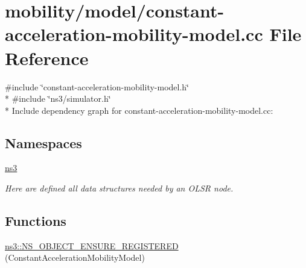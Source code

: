 \hypertarget{constant-acceleration-mobility-model_8cc}{}\section{mobility/model/constant-\/acceleration-\/mobility-\/model.cc File Reference}
\label{constant-acceleration-mobility-model_8cc}
{\ttfamily \#include \char`\"{}constant-\/acceleration-\/mobility-\/model.\+h\char`\"{}}\\*
{\ttfamily \#include \char`\"{}ns3/simulator.\+h\char`\"{}}\\*
Include dependency graph for constant-\/acceleration-\/mobility-\/model.cc\+:
\subsection*{Namespaces}
\begin{DoxyCompactItemize}
\item 
 \hyperlink{namespacens3}{ns3}
\begin{DoxyCompactList}\small\item\em Here are defined all data structures needed by an O\+L\+SR node. \end{DoxyCompactList}\end{DoxyCompactItemize}
\subsection*{Functions}
\begin{DoxyCompactItemize}
\item 
\hyperlink{namespacens3_a32e9cba882bb4b5ae4334333f2821d44}{ns3\+::\+N\+S\+\_\+\+O\+B\+J\+E\+C\+T\+\_\+\+E\+N\+S\+U\+R\+E\+\_\+\+R\+E\+G\+I\+S\+T\+E\+R\+ED} (Constant\+Acceleration\+Mobility\+Model)
\end{DoxyCompactItemize}
